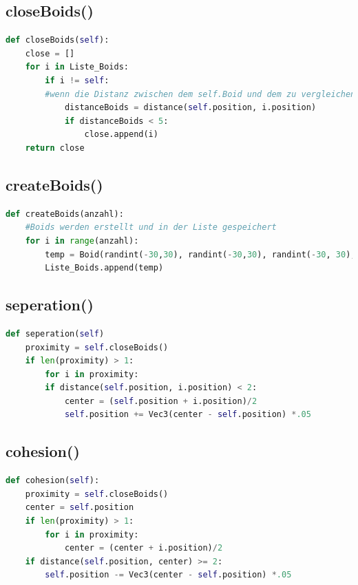 \documentclass[a4paper, hidelinks, 12pt]{article}
\begin{document}
\subsection{closeBoids()}\label{CodecloseBoids}
\begin{lstlisting}[style=mystyle, language=Python]
def closeBoids(self):
    close = []
    for i in Liste_Boids:
    	if i != self:
    	#wenn die Distanz zwischen dem self.Boid und dem zu vergleichenden Boid unter 5 liegt wird der vergleichende Boid in die Liste mit den Boids in der Naehe hinzugefuegt
		    distanceBoids = distance(self.position, i.position)
    		if distanceBoids < 5:
    			close.append(i)
    return close
\end{lstlisting}
\newpage
\subsection{createBoids()}\label{CodecreateBoids}
\begin{lstlisting}[style=mystyle, language=Python]
def createBoids(anzahl):
	#Boids werden erstellt und in der Liste gespeichert
	for i in range(anzahl):
		temp = Boid(randint(-30,30), randint(-30,30), randint(-30, 30), randint(0,360), randint(0,360), randint(0,360), uniform(0.0, 100.0), uniform(0.0, 10.0), 300.0, 1, groesse)
		Liste_Boids.append(temp)
\end{lstlisting}
\subsection{seperation()}\label{Codeseperation}
\begin{lstlisting}[style=mystyle, language=Python]
def seperation(self)
	proximity = self.closeBoids()
	if len(proximity) > 1:
		for i in proximity:
		if distance(self.position, i.position) < 2:
			center = (self.position + i.position)/2
			self.position += Vec3(center - self.position) *.05
\end{lstlisting}
\subsection{cohesion()}\label{Codecohesion}
\begin{lstlisting}[style=mystyle, language=Python]
def cohesion(self):
	proximity = self.closeBoids()
	center = self.position
	if len(proximity) > 1:
		for i in proximity:
			center = (center + i.position)/2
	if distance(self.position, center) >= 2:
		self.position -= Vec3(center - self.position) *.05
\end{lstlisting}
\end{document}
